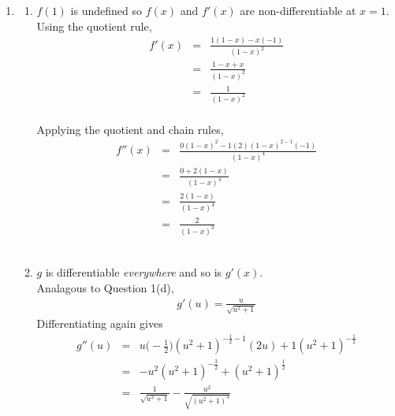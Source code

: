 \documentclass[12pt]{amsart}
\begin{document}
\begin{enumerate}
	\item 
	
		\begin{enumerate}
		
			\item $f(1)$ is undefined so $f(x)$ and $f'(x)$ are non-differentiable at $x=1$. \\
			Using the quotient rule,
				\begin{eqnarray}
					f'(x) & = & \frac{1(1-x)-x(-1)}{(1-x)^2} \nonumber \\
					& = & \frac{1-x+x}{(1-x)^2} \nonumber \\
					& = & \frac{1}{(1-x)^2} \nonumber
				\end{eqnarray} \\
				Applying the quotient and chain rules,
				\begin{eqnarray}
					f''(x) & = & \frac{0(1-x)^2-1(2)(1-x)^{2-1}(-1)}{(1-x)^4} \nonumber \\
					& = & \frac{0+2(1-x)}{(1-x)^4} \nonumber \\
					& = & \frac{2(1-x)}{(1-x)^4} \nonumber \\
					& = & \frac{2}{(1-x)^3} \nonumber
				\end{eqnarray} \\
													
			\item $g$ is differentiable \emph{everywhere} and so is $g'(x)$. \\  
			Analagous to Question 1(d),
				\begin{eqnarray}
					g'(u) = \frac{u}{\sqrt{u^2+1}} \nonumber
				\end{eqnarray}
			Differentiating again gives
				\begin{eqnarray}
					g''(u)&=&u\bigg(-\frac{1}{2}\bigg)(u^2+1)^{-\frac{1}{2}-1}(2u)+ 1(u^2+1)^{-\frac{1}{2}} 					\nonumber \\
					&=&-u^2(u^2+1)^{-\frac{3}{2}} +(u^2+1)^\frac{1}{2} \nonumber \\
					&=& \frac{1}{\sqrt{u^2+1}} - \frac{u^2}{\sqrt{(u^2+1)^3}} \nonumber
				\end{eqnarray}\\
			

\end{enumerate}
\end{enumerate}
\end{document}
